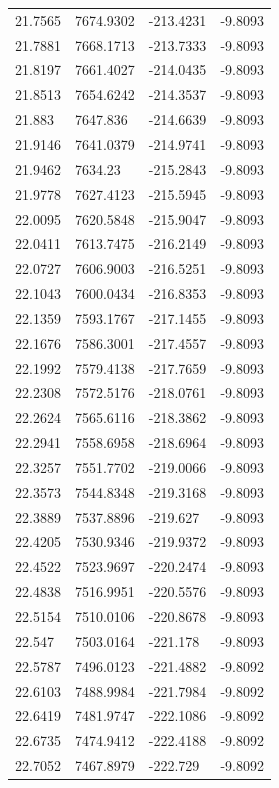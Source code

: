 \begin{table}[H]
\begin{tabular}{llll}
21.7565 & 7674.9302 & -213.4231 & -9.8093 \\
21.7881 & 7668.1713 & -213.7333 & -9.8093 \\
21.8197 & 7661.4027 & -214.0435 & -9.8093 \\
21.8513 & 7654.6242 & -214.3537 & -9.8093 \\
21.883 & 7647.836 & -214.6639 & -9.8093 \\
21.9146 & 7641.0379 & -214.9741 & -9.8093 \\
21.9462 & 7634.23 & -215.2843 & -9.8093 \\
21.9778 & 7627.4123 & -215.5945 & -9.8093 \\
22.0095 & 7620.5848 & -215.9047 & -9.8093 \\
22.0411 & 7613.7475 & -216.2149 & -9.8093 \\
22.0727 & 7606.9003 & -216.5251 & -9.8093 \\
22.1043 & 7600.0434 & -216.8353 & -9.8093 \\
22.1359 & 7593.1767 & -217.1455 & -9.8093 \\
22.1676 & 7586.3001 & -217.4557 & -9.8093 \\
22.1992 & 7579.4138 & -217.7659 & -9.8093 \\
22.2308 & 7572.5176 & -218.0761 & -9.8093 \\
22.2624 & 7565.6116 & -218.3862 & -9.8093 \\
22.2941 & 7558.6958 & -218.6964 & -9.8093 \\
22.3257 & 7551.7702 & -219.0066 & -9.8093 \\
22.3573 & 7544.8348 & -219.3168 & -9.8093 \\
22.3889 & 7537.8896 & -219.627 & -9.8093 \\
22.4205 & 7530.9346 & -219.9372 & -9.8093 \\
22.4522 & 7523.9697 & -220.2474 & -9.8093 \\
22.4838 & 7516.9951 & -220.5576 & -9.8093 \\
22.5154 & 7510.0106 & -220.8678 & -9.8093 \\
22.547 & 7503.0164 & -221.178 & -9.8093 \\
22.5787 & 7496.0123 & -221.4882 & -9.8092 \\
22.6103 & 7488.9984 & -221.7984 & -9.8092 \\
22.6419 & 7481.9747 & -222.1086 & -9.8092 \\
22.6735 & 7474.9412 & -222.4188 & -9.8092 \\
22.7052 & 7467.8979 & -222.729 & -9.8092 \\

\end{tabular}
\end{table}
